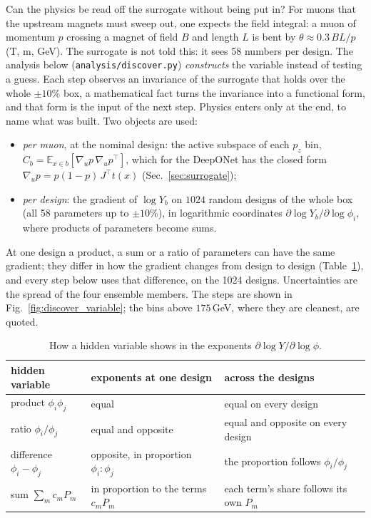 \documentclass[11pt,a4paper]{article}
\begin{document}
Can the physics be read off the surrogate without being put in? For muons that the upstream
magnets must sweep out, one expects the field integral: a muon of momentum $p$ crossing a magnet of
field $B$ and length $L$ is bent by $\theta\approx0.3\,BL/p$ (T, m, GeV). The surrogate is not
told this: it sees 58 numbers per design. The analysis below (\texttt{analysis/discover.py})
\emph{constructs} the variable instead of testing a guess. Each step observes an invariance of the
surrogate that holds over the whole $\pm10\%$ box, a mathematical fact turns the invariance into
a functional form, and that form is the input of the next step. Physics enters only at the end, to
name what was built. Two objects are used:
\begin{itemize}
  \item \emph{per muon}, at the nominal design: the active subspace of each $p_z$ bin,
        $C_b=\mathbb{E}_{x\in b}[\nabla_up\,\nabla_up^\top]$, which for the DeepONet has the
        closed form $\nabla_up=p(1-p)\,J^\top t(x)$ (Sec.~\ref{sec:surrogate});
  \item \emph{per design}: the gradient of $\log Y_b$ on $1024$ random designs of the whole box
        (all 58 parameters up to $\pm10\%$), in logarithmic coordinates
        $\partial\log Y_b/\partial\log\phi_i$, where products of parameters become sums.
\end{itemize}
At one design a product, a sum or a ratio of parameters can have the same gradient; they differ in
how the gradient changes from design to design (Table~\ref{tab:reading}), and every step below
uses that difference, on the 1024 designs. Uncertainties are the spread of the four ensemble
members. The steps are shown in Fig.~\ref{fig:discover_variable}; the bins above $175$\,GeV,
where they are cleanest, are quoted.

\begin{table}[h]
  \centering\small
  \begin{tabular}{lll}
    \toprule
    hidden variable & exponents at one design & across the designs \\
    \midrule
    product $\phi_i\phi_j$ & equal & equal on every design \\
    ratio $\phi_i/\phi_j$ & equal and opposite & equal and opposite on every design \\
    difference $\phi_i-\phi_j$ & opposite, in proportion $\phi_i:\phi_j$ & the proportion follows $\phi_i/\phi_j$ \\
    sum $\sum_mc_mP_m$ & in proportion to the terms $c_mP_m$ & each term's share follows its own $P_m$ \\
    \bottomrule
  \end{tabular}
  \caption{How a hidden variable shows in the exponents $\partial\log Y/\partial\log\phi$.}
  \label{tab:reading}
\end{table}
\end{document}
